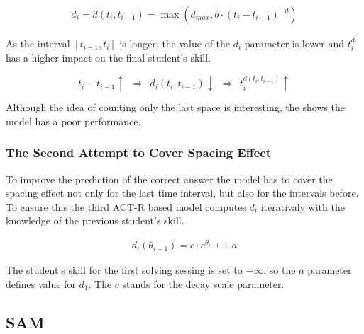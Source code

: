 \documentclass[a4paper]{article}
\begin{document}
\begin{align}
d_i = d(t_i, t_{i-1}) = \max\left(d_{max}, b \cdot (t_i - t_{i-1})^{-d}\right)
\end{align}

As the interval $[t_{i-1}, t_i]$ is longer, the value of the $d_i$ parameter is lower and $t_i^{d_i}$
has a higher impact on the final student's skill.

$$
t_i - t_{i-1} \uparrow~~\Longrightarrow~~d_i(t_i, t_{i-1})\downarrow~~\Longrightarrow~~t_i^{d(t_i, t_{i-1})} \uparrow
$$

Although the idea of counting only the last space is interesting, the \cite{Pavlik2005} shows the
model has a poor performance.

\subsubsection{The Second Attempt to Cover Spacing Effect}

To improve the prediction of the correct answer the model has to cover the spacing effect not only
for the last time interval, but also for the intervals before. To ensure this the third ACT-R based
model computes $d_i$ iterativaly with the knowledge of the previous student's skill.

\begin{align}
d_i(\theta_{i-1}) = c \cdot e^{\theta_{i-1}} + a
\end{align}

The student's skill for the first solving sessing is set to $-\infty$, so the $a$ parameter defines
value for $d_1$. The $c$ stands for the decay scale parameter.


\subsection{SAM}



\nocite{*}

\end{document}
